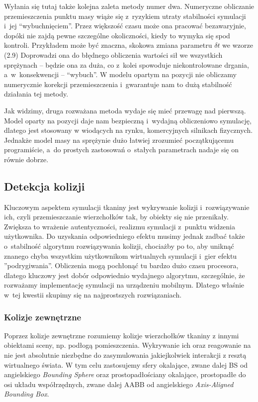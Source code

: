 			Wyłania się tutaj także kolejna zaleta metody numer dwa. Numeryczne obliczanie przemieszczenia punktu masy wiąże się z~ryzykiem utraty stabilności symulacji i~jej ``wybuchnięciem''. Przez większość czasu może ona pracować bezawaryjnie, dopóki nie zajdą pewne szczególne okoliczności, kiedy to wymyka się spod kontroli. Przykładem może być znaczna, skokowa zmiana parametru \( \delta t \) we wzorze (2.9) Doprowadzi ona do błędnego obliczenia wartości sił we wszystkich sprężynach -- będzie ona za duża, co z~kolei spowoduje niekontrolowane drgania, a~w~konsekwencji -- ``wybuch''. W modelu opartym na pozycji nie obliczamy numerycznie korekcji przemieszczenia i~gwarantuje nam to dużą stabilność działania tej metody.
			
			Jak widzimy, druga rozważana metoda wydaje się mieć przewagę nad pierwszą. Model oparty na pozycji daje nam bezpieczną i~wydajną obliczeniowo symulację, dlatego jest stosowany w wiodących na rynku, komercyjnych silnikach fizycznych. Jednakże model masy na sprężynie dużo łatwiej zrozumieć początkującemu programiście, a~do prostych zastosowań o~stałych parametrach nadaje się on równie dobrze.
		
		\subsection{Detekcja kolizji}
		\label{t:teoria:analiza:kolizje}
		
			Kluczowym aspektem symulacji tkaniny jest wykrywanie kolizji i~rozwiązywanie ich, czyli przemieszczanie wierzchołków tak, by obiekty się nie przenikały. Zwiększa to wrażenie autentyczności, realizmu symulacji z~punktu widzenia użytkownika. Do uzyskania odpowiedniego efektu musimy jednak zadbać także o~stabilność algorytmu rozwiązywania kolizji, chociażby po to, aby uniknąć znanego chyba wszystkim użytkownikom wirtualnych symulacji i~gier efektu ''podrygiwania''. Obliczenia mogą pochłonąć tu bardzo dużo czasu procesora, dlatego kluczowy jest dobór odpowiednio wydajnego algorytmu, szczególnie, że rozważamy implementację symulacji na urządzeniu mobilnym. Dlatego właśnie w~tej kwestii skupimy się na najprostszych rozwiązaniach.
		
			\subsubsection{Kolizje zewnętrzne}
			\label{t:teoria:analiza:kolizje:zewn}
			
				Poprzez kolizje zewnętrzne rozumiemy kolizje wierzchołków tkaniny z innymi obiektami sceny, np. podłogą pomieszczenia. Wykrywanie ich oraz reagowanie na nie jest absolutnie niezbędne do zasymulowania jakiejkolwiek interakcji z resztą wirtualnego świata. W tym celu zastosujemy sfery okalające, zwane dalej BS od angielskiego \emph{Bounding Sphere} oraz prostopadłościany okalające, prostopadłe do osi układu współrzędnych, zwane dalej AABB od angielskiego \emph{Axis-Aligned Bounding Box}.
				
